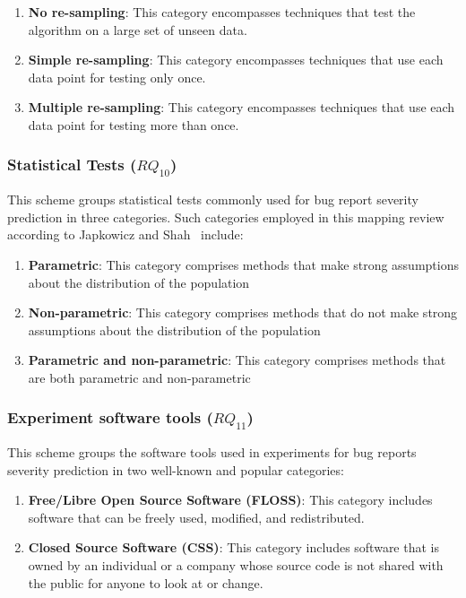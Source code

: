 \begin{enumerate}[label=\alph*., leftmargin=1.2cm]
  \item \textbf{No re-sampling}: This category encompasses techniques that test the algorithm on a large set of unseen data.
  \item \textbf{Simple re-sampling}: This category encompasses techniques that use each data point for testing only once. 
  \item \textbf{Multiple re-sampling}: This category encompasses techniques that use each data point for testing more than once. 
\end{enumerate}

\subsubsection{Statistical Tests ($RQ_{10}$)}
This scheme groups statistical tests commonly used for bug report severity prediction in three categories. Such categories employed in this mapping review according to Japkowicz and Shah~\cite{Japkowicz:2011} include:

\begin{enumerate}[label=\alph*., leftmargin=1.2cm]
  \item \textbf{Parametric}: This category comprises methods that make strong assumptions about the distribution of the population
  \item \textbf{Non-parametric}: This category comprises methods that do not make strong assumptions about the distribution of the population
  \item \textbf{Parametric and non-parametric}: This category comprises methods that are both parametric and non-parametric
\end{enumerate}

\subsubsection{Experiment software tools ($RQ_{11}$)}
This scheme groups the software tools used in experiments for bug reports severity prediction in two well-known and popular categories: 

\begin{enumerate}[label=\alph*., leftmargin=1.2cm]
  \item \textbf{Free/Libre Open Source Software (FLOSS)}: This category includes software that can be freely used, modified, and redistributed.
  \item \textbf{Closed Source Software (CSS)}: This category includes software that is owned by an individual or a company whose source code is not shared with the public for anyone to look at or change. 
\end{enumerate}
